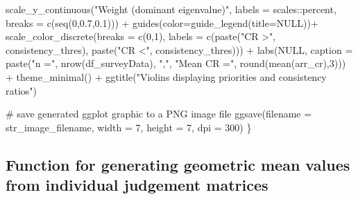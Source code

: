 \documentclass[
]{article}
\newenvironment{Shaded}{\begin{snugshade}}{\end{snugshade}}
\newcommand{\AttributeTok}[1]{\textcolor[rgb]{0.00,0.34,0.68}{#1}}
\newcommand{\CommentTok}[1]{\textcolor[rgb]{0.54,0.53,0.53}{#1}}
\newcommand{\ConstantTok}[1]{\textcolor[rgb]{0.67,0.33,0.00}{#1}}
\newcommand{\DecValTok}[1]{\textcolor[rgb]{0.69,0.50,0.00}{#1}}
\newcommand{\FloatTok}[1]{\textcolor[rgb]{0.69,0.50,0.00}{#1}}
\newcommand{\FunctionTok}[1]{\textcolor[rgb]{0.39,0.29,0.61}{#1}}
\newcommand{\NormalTok}[1]{\textcolor[rgb]{0.12,0.11,0.11}{#1}}
\newcommand{\SpecialCharTok}[1]{\textcolor[rgb]{0.24,0.68,0.91}{#1}}
\newcommand{\StringTok}[1]{\textcolor[rgb]{0.75,0.01,0.01}{#1}}
\begin{document}
\begin{Shaded}
\begin{Highlighting}[]
  \FunctionTok{scale\_y\_continuous}\NormalTok{(}\StringTok{"Weight (dominant eigenvalue)"}\NormalTok{, }
                     \AttributeTok{labels =}\NormalTok{ scales}\SpecialCharTok{::}\NormalTok{percent, }
                     \AttributeTok{breaks =} \FunctionTok{c}\NormalTok{(}\FunctionTok{seq}\NormalTok{(}\DecValTok{0}\NormalTok{,}\FloatTok{0.7}\NormalTok{,}\FloatTok{0.1}\NormalTok{))) }\SpecialCharTok{+}
  \FunctionTok{guides}\NormalTok{(}\AttributeTok{color=}\FunctionTok{guide\_legend}\NormalTok{(}\AttributeTok{title=}\ConstantTok{NULL}\NormalTok{))}\SpecialCharTok{+}
  \FunctionTok{scale\_color\_discrete}\NormalTok{(}\AttributeTok{breaks =} \FunctionTok{c}\NormalTok{(}\DecValTok{0}\NormalTok{,}\DecValTok{1}\NormalTok{), }
                       \AttributeTok{labels =} \FunctionTok{c}\NormalTok{(}\FunctionTok{paste}\NormalTok{(}\StringTok{"CR \textgreater{}"}\NormalTok{, consistency\_thres), }
                                  \FunctionTok{paste}\NormalTok{(}\StringTok{"CR \textless{}"}\NormalTok{, consistency\_thres))) }\SpecialCharTok{+}
  \FunctionTok{labs}\NormalTok{(}\ConstantTok{NULL}\NormalTok{, }\AttributeTok{caption =} \FunctionTok{paste}\NormalTok{(}\StringTok{"n ="}\NormalTok{, }\FunctionTok{nrow}\NormalTok{(df\_surveyData), }\StringTok{","}\NormalTok{, }\StringTok{"Mean CR ="}\NormalTok{,}
                           \FunctionTok{round}\NormalTok{(}\FunctionTok{mean}\NormalTok{(arr\_cr),}\DecValTok{3}\NormalTok{))) }\SpecialCharTok{+}
  \FunctionTok{theme\_minimal}\NormalTok{() }\SpecialCharTok{+}
  \FunctionTok{ggtitle}\NormalTok{(}\StringTok{"Violins displaying priorities and consistency ratios"}\NormalTok{)}

  \CommentTok{\# save generated ggplot graphic to a PNG image file}
  \FunctionTok{ggsave}\NormalTok{(}\AttributeTok{filename =}\NormalTok{ str\_image\_filename, }\AttributeTok{width =} \DecValTok{7}\NormalTok{, }\AttributeTok{height =} \DecValTok{7}\NormalTok{, }\AttributeTok{dpi =} \DecValTok{300}\NormalTok{)}
\NormalTok{\}}
\end{Highlighting}
\end{Shaded}

\hypertarget{function-for-generating-geometric-mean-values-from-individual-judgement-matrices}{%
\subsection{Function for generating geometric mean values from
individual judgement
matrices}\label{function-for-generating-geometric-mean-values-from-individual-judgement-matrices}}
\end{document}
